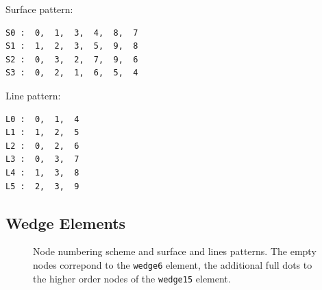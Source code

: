 Surface pattern:
\begin{verbatim}
S0 :  0,  1,  3,  4,  8,  7
S1 :  1,  2,  3,  5,  9,  8
S2 :  0,  3,  2,  7,  9,  6
S3 :  0,  2,  1,  6,  5,  4
\end{verbatim}

Line pattern:
\begin{verbatim}
L0 :  0,  1,  4
L1 :  1,  2,  5
L2 :  0,  2,  6
L3 :  0,  3,  7
L4 :  1,  3,  8
L5 :  2,  3,  9
\end{verbatim}

\newpage
\subsection{Wedge Elements}

\begin{figure}[h!]
\begin{center}
\caption{Node numbering scheme and surface and lines patterns. The empty nodes correpond to the \texttt{wedge6} element, the additional full dots to the higher order nodes of the \texttt{wedge15} element.}
\label{fig:conventions:wedge}
\end{center}
\end{figure}




